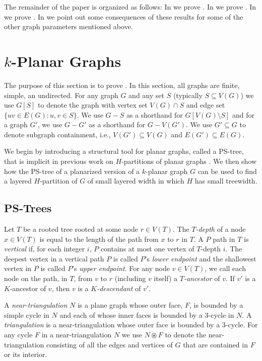 \documentclass{patmorin}
\begin{document}
The remainder of the paper is organized as follows: In  we prove .  In  we prove .  
In  we prove . In  we point out some consequences of these results for some of the other graph parameters mentioned above.


\section{$k$-Planar Graphs}

The purpose of this section is to prove .  In this section, all graphs are finite, simple, an undirected.  For any graph $G$ and any set $S$ (typically $S\subseteq V(G)$) we use $G[S]$ to denote the graph with vertex set $V(G)\cap S$ and edge set $\{uv\in E(G) : u,v\in S\}$.  We use $G-S$ as a shorthand for $G[V(G)\setminus S]$ and for a graph $G'$, we use $G-G'$ as a shorthand for $G-V(G')$.  We use $G'\subseteq G$ to denote subgraph containment, i.e., $V(G')\subseteq V(G)$ and $E(G')\subseteq E(G)$.

We begin by introducing a structural tool for planar graphs, called a PS-tree, that is implicit in previous work on $H$-partitions of planar graphs \cite{dujmovic.joret.ea:planar}.  We then show how the PS-tree of a planarized version of a $k$-planar graph $G$ can be used to find a layered $H$-partition of $G$ of small layered width in which $H$ has small treewidth. 

\subsection{PS-Trees}

Let $T$ be a rooted tree rooted at some node $r\in V(T)$. The \emph{$T$-depth} of a node $x\in V(T)$ is equal to the length of the path from $x$ to $r$ in $T$. A $P$ path in $T$ is \emph{vertical} if, for each integer $i$, $P$ contains at most one vertex of $T$-depth $i$.  The deepest vertex in a vertical path $P$ is called  $P$'s \emph{lower endpoint} and the shallowest vertex in $P$ is called $P$'s \emph{upper endpoint}. For any node $v\in V(T)$, we call each node on the path, in $T$, from $v$ to $r$ (including $v$ itself) a \emph{$T$-ancestor} of $v$.  If $v'$ is a $K$-ancestor of $v$, then $v$ is a \emph{$K$-descendant} of $v'$.

A \emph{near-triangulation} $N$ is a plane graph whose outer face, $F$, is bounded by a simple cycle in $N$ and each of whose inner faces is bounded by a 3-cycle in $N$.  A \emph{triangulation} is a near-triangulation whose outer face is bounded by a 3-cycle.  For any cycle $F$ in a near-triangulation $N$ we use $N\circledast F$ to denote the near-triangulation consisting of all the edges and vertices of $G$ that are contained in $F$ or its interior.
\end{document}
